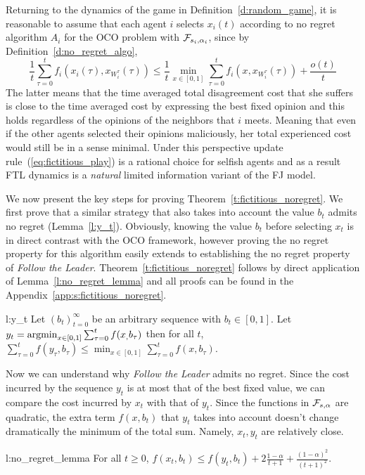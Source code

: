 Returning to the dynamics of the game in Definition~\ref{d:random_game},
it is reasonable to assume that each agent $i$ selects $x_i(t)$ according
to no regret algorithm $A_i$ for the OCO problem with $\mathcal{F}_{s_i,\alpha_i}$,
since by Definition~\ref{d:no_regret_algo},
\[\frac{1}{t}\sum_{\tau=0}^t f_i(x_i(\tau),x_{W_i^\tau}(\tau)) \leq
\frac{1}{t}\min_{x \in [0,1]}\sum_{\tau=0}^tf_i(x,x_{W_i^\tau}(\tau)) + \frac{o(t)}{t}\]
The latter means that the time averaged total disagreement cost
that she suffers is close to the time averaged cost by expressing the
best fixed opinion and this holds regardless of the opinions of the
neighbors that $i$ meets. Meaning that even if the other agents
selected their opinions maliciously, her total experienced cost
would still be in a sense minimal. Under this perspective
update rule~(\ref{eq:fictitious_play}) is a rational choice for
selfish agents and as a result FTL dynamics is 
a \emph{natural} limited information variant of the FJ model.



We now present the key steps for proving Theorem~\ref{t:fictitious_noregret}.
We first prove that a similar strategy that also takes into
account the value $b_t$ admits no regret (Lemma~\ref{l:y_t}).
Obviously, knowing the value $b_t$ before selecting $x_t$
is in direct contrast with the OCO framework, however proving
the no regret property for this algorithm easily extends to
establishing the no regret property of \emph{Follow the Leader}.
Theorem~\ref{t:fictitious_noregret} follows
by direct application of Lemma~\ref{l:no_regret_lemma}
and all proofs can be found in the Appendix~\ref{app:s:fictitious_noregret}.
\begin{replemma}{l:y_t}
Let $(b_t)_{t=0}^\infty$ be an arbitrary sequence with $b_t \in [0,1]$.
Let $y_t = \operatorname*{argmin}_{x \in [0,1]}\sum_{\tau=0}^tf(x_,b_\tau)$
then for all $t$,
\(
\sum_{\tau=0}^t f(y_\tau,b_\tau) \leq \min_{x \in [0,1]}
\sum_{\tau = 0}^tf(x,b_\tau).
\)
\end{replemma}
Now we can understand why \emph{Follow the Leader}
admits no regret. Since the cost incurred by the sequence $y_t$ is at most that
of the best fixed value, we can compare the cost incurred by $x_t$ with
that of $y_t$.  Since the functions in $\mathcal{F}_{s,\alpha}$ are quadratic,
the extra term $f(x,b_t)$ that $y_t$ takes into account doesn't change
dramatically the minimum of the total sum. Namely, $x_t,y_t$
are relatively close.
\begin{replemma}{l:no_regret_lemma}
  For all $t\geq 0$,
  \(
    f(x_t,b_t) \leq f(y_t,b_t) + 2\frac{1-\alpha}{t+1} +
    \frac{(1-\alpha)^2}{(t+1)^2}
  \).
\end{replemma}